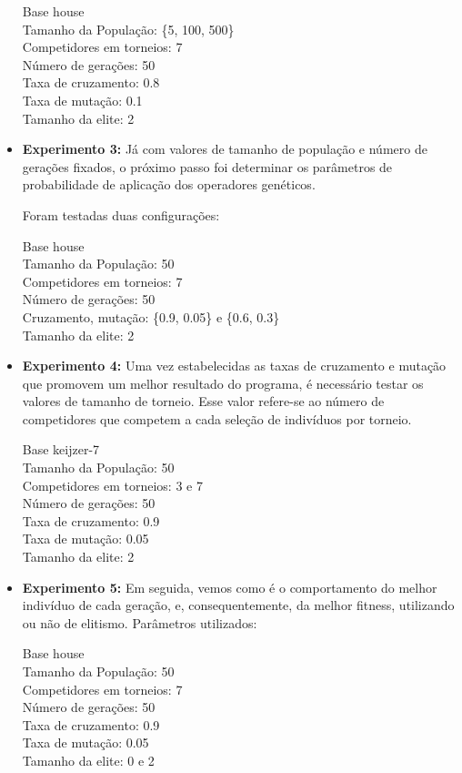 \documentclass[12pt]{article}
\begin{document}
\begin{itemize}
 Base house \\
 Tamanho da População: \{5, 100, 500\} \\
 Competidores em torneios: 7 \\
 Número de gerações: 50 \\
 Taxa de cruzamento: 0.8 \\
 Taxa de mutação: 0.1 \\
 Tamanho da elite: 2 \\
 
 \item \textbf{Experimento 3:} Já com valores de tamanho de população e número de gerações fixados,
 o próximo passo foi determinar os parâmetros de probabilidade de aplicação dos operadores genéticos.
 
 Foram testadas duas configurações:
 
 Base house \\
 Tamanho da População: 50 \\
 Competidores em torneios: 7 \\
 Número de gerações: 50 \\
 Cruzamento, mutação: \{0.9, 0.05\} e \{0.6, 0.3\} \\
 Tamanho da elite: 2 \\
 
 \item \textbf{Experimento 4:} Uma vez estabelecidas as taxas de cruzamento e mutação que promovem
 um melhor resultado do programa, é necessário testar os valores de tamanho de torneio. Esse valor
 refere-se ao número de competidores que competem a cada seleção de indivíduos por torneio.
 
 Base keijzer-7 \\
 Tamanho da População: 50 \\
 Competidores em torneios: 3 e 7 \\
 Número de gerações: 50 \\
 Taxa de cruzamento: 0.9 \\ 
 Taxa de mutação: 0.05 \\
 Tamanho da elite: 2 \\
 
 \item \textbf{Experimento 5:} Em seguida, vemos como é o comportamento do melhor indivíduo de
 cada geração, e, consequentemente, da melhor fitness, utilizando ou não de elitismo. Parâmetros
 utilizados:
 
 Base house \\
 Tamanho da População: 50 \\
 Competidores em torneios: 7 \\
 Número de gerações: 50 \\
 Taxa de cruzamento: 0.9 \\ 
 Taxa de mutação: 0.05 \\
 Tamanho da elite: 0 e 2 \\
 

\end{itemize}
\end{document}
